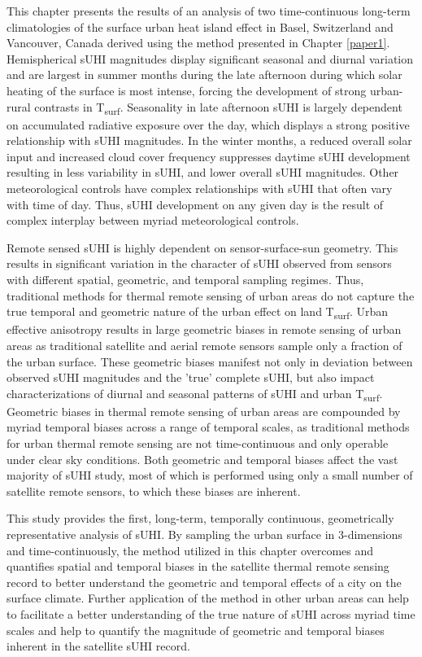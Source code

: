 \begin{bibunit}
This chapter presents the results of an analysis of two time-continuous long-term climatologies of the surface urban heat island effect in Basel, Switzerland and Vancouver, Canada derived using the method presented in Chapter \ref{paper1}. Hemispherical sUHI magnitudes display significant seasonal and diurnal variation and are largest in summer months during the late afternoon during which solar heating of the surface is most intense, forcing the development of strong urban-rural contrasts in T\textsubscript{surf}. Seasonality in late afternoon sUHI is largely dependent on accumulated radiative exposure over the day, which displays a strong positive relationship with sUHI magnitudes. In the winter months, a reduced overall solar input and increased cloud cover frequency suppresses daytime sUHI development resulting in less variability in sUHI, and lower overall sUHI magnitudes. Other meteorological controls have complex relationships with sUHI that often vary with time of day. Thus, sUHI development on any given day is the result of complex interplay between myriad meteorological controls. 

Remote sensed sUHI is highly dependent on sensor-surface-sun geometry. This results in significant variation in the character of sUHI observed from sensors with different spatial, geometric, and temporal sampling regimes. Thus, traditional methods for thermal remote sensing of urban areas do not capture the true temporal and geometric nature of the urban effect on land T\textsubscript{surf}. Urban effective anisotropy results in large geometric biases in remote sensing of urban areas as traditional satellite and aerial remote sensors sample only a fraction of the urban surface. These geometric biases manifest not only in deviation between observed sUHI magnitudes and the 'true' complete sUHI, but also impact characterizations of diurnal and seasonal patterns of sUHI and urban T\textsubscript{surf}. Geometric biases in thermal remote sensing of urban areas are compounded by myriad temporal biases across a range of temporal scales, as traditional methods for urban thermal remote sensing are not time-continuous and only operable under clear sky conditions. Both geometric and temporal biases affect the vast majority of sUHI study, most of which is performed using only a small number of satellite remote sensors, to which these biases are inherent.

This study provides the first, long-term, temporally continuous, geometrically representative analysis of sUHI. By sampling the urban surface in 3-dimensions and time-continuously, the method utilized in this chapter overcomes and quantifies spatial and temporal biases in the satellite thermal remote sensing record to better understand the geometric and temporal effects of a city on the surface climate. Further application of the method in other urban areas can help to facilitate a better understanding of the true nature of sUHI across myriad time scales and help to quantify the magnitude of geometric and temporal biases inherent in the satellite sUHI record.

\cleardoublepage 
{}  
\renewcommand*{\bibname}{References}


\putbib
\end{bibunit}